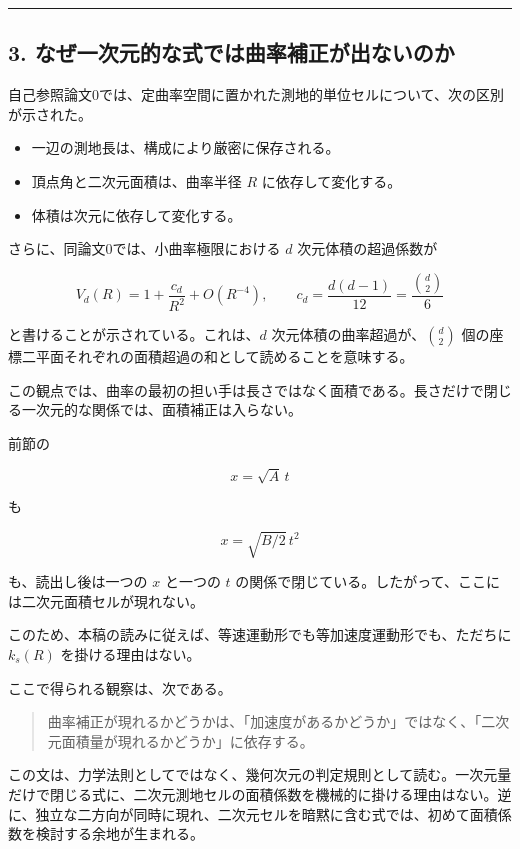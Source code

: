 \documentclass[
]{ltjsarticle}
\providecommand{\tightlist}{%
  \setlength{\itemsep}{0pt}\setlength{\parskip}{0pt}}
\begin{document}
\begin{center}\rule{0.5\linewidth}{0.5pt}\end{center}

\subsection{3.
なぜ一次元的な式では曲率補正が出ないのか}\label{ux306aux305cux4e00ux6b21ux5143ux7684ux306aux5f0fux3067ux306fux66f2ux7387ux88dcux6b63ux304cux51faux306aux3044ux306eux304b}

自己参照論文0では、定曲率空間に置かれた測地的単位セルについて、次の区別が示された。

\begin{itemize}
\tightlist
\item
  一辺の測地長は、構成により厳密に保存される。
\item
  頂点角と二次元面積は、曲率半径 \(R\) に依存して変化する。
\item
  体積は次元に依存して変化する。
\end{itemize}

さらに、同論文0では、小曲率極限における \(d\) 次元体積の超過係数が

\[
V_d(R)=1+\frac{c_d}{R^2}+O(R^{-4}),
\qquad
c_d=\frac{d(d-1)}{12}
=\frac{\binom{d}{2}}{6}
\]

と書けることが示されている。これは、\(d\)
次元体積の曲率超過が、\(\binom{d}{2}\)
個の座標二平面それぞれの面積超過の和として読めることを意味する。

この観点では、曲率の最初の担い手は長さではなく面積である。長さだけで閉じる一次元的な関係では、面積補正は入らない。

前節の

\[
x=\sqrt{A}\,t
\]

も

\[
x=\sqrt{B/2}\,t^2
\]

も、読出し後は一つの \(x\) と一つの \(t\)
の関係で閉じている。したがって、ここには二次元面積セルが現れない。

このため、本稿の読みに従えば、等速運動形でも等加速度運動形でも、ただちに
\(k_s(R)\) を掛ける理由はない。

ここで得られる観察は、次である。

\begin{quote}
曲率補正が現れるかどうかは、「加速度があるかどうか」ではなく、「二次元面積量が現れるかどうか」に依存する。
\end{quote}

この文は、力学法則としてではなく、幾何次元の判定規則として読む。一次元量だけで閉じる式に、二次元測地セルの面積係数を機械的に掛ける理由はない。逆に、独立な二方向が同時に現れ、二次元セルを暗黙に含む式では、初めて面積係数を検討する余地が生まれる。
\end{document}
